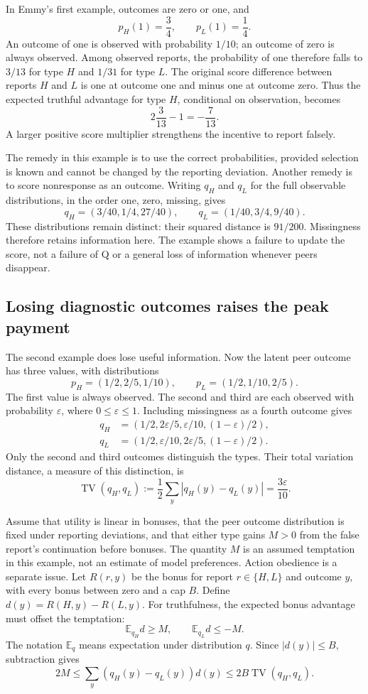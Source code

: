 \documentclass{article}
\begin{document}
In Emmy's first example, outcomes are zero or one, and
\[
p_H(1)=\frac34,\qquad p_L(1)=\frac14.
\]
An outcome of one is observed with probability \(1/10\); an outcome of zero is always observed.
Among observed reports, the probability of one therefore falls to \(3/13\) for type \(H\) and \(1/31\) for type \(L\).
The original score difference between reports \(H\) and \(L\) is one at outcome one and minus one at outcome zero.
Thus the expected truthful advantage for type \(H\), conditional on observation, becomes
\[
2\frac3{13}-1=-\frac7{13}.
\]
A larger positive score multiplier strengthens the incentive to report falsely.

The remedy in this example is to use the correct probabilities, provided selection is known and cannot be
changed by the reporting deviation.
Another remedy is to score nonresponse as an outcome.
Writing \(q_H\) and \(q_L\) for the full observable distributions, in the order one, zero, missing, gives
\[
q_H=(3/40,1/4,27/40),\qquad
q_L=(1/40,3/4,9/40).
\]
These distributions remain distinct: their squared distance is \(91/200\).
Missingness therefore retains information here.
The example shows a failure to update the score, not a failure of Q or a general loss of information whenever peers disappear.

\subsection{Losing diagnostic outcomes raises the peak payment}
The second example does lose useful information.
Now the latent peer outcome has three values, with distributions
\[
p_H=(1/2,2/5,1/10),\qquad
p_L=(1/2,1/10,2/5).
\]
The first value is always observed.
The second and third are each observed with probability \(\varepsilon\), where \(0\leq\varepsilon\leq1\).
Including missingness as a fourth outcome gives
\begin{align*}
q_H&=(1/2,2\varepsilon/5,\varepsilon/10,(1-\varepsilon)/2),\\
q_L&=(1/2,\varepsilon/10,2\varepsilon/5,(1-\varepsilon)/2).
\end{align*}
Only the second and third outcomes distinguish the types.
Their total variation distance, a measure of this distinction, is
\[
\operatorname{TV}(q_H,q_L)
:=\frac12\sum_y|q_H(y)-q_L(y)|=\frac{3\varepsilon}{10}.
\]

Assume that utility is linear in bonuses, that the peer outcome distribution is fixed under reporting
deviations, and that either type gains \(M>0\) from the false report's continuation before bonuses.
The quantity \(M\) is an assumed temptation in this example, not an estimate of model preferences.
Action obedience is a separate issue.
Let \(R(r,y)\) be the bonus for report \(r\in\{H,L\}\) and outcome \(y\), with every bonus between zero and a cap \(B\).
Define \(d(y)=R(H,y)-R(L,y)\).
For truthfulness, the expected bonus advantage must offset the temptation:
\[
\mathbb E_{q_H}d\geq M,\qquad
\mathbb E_{q_L}d\leq-M.
\]
The notation \(\mathbb E_q\) means expectation under distribution \(q\).
Since \(|d(y)|\leq B\), subtraction gives
\[
2M\leq\sum_y(q_H(y)-q_L(y))d(y)
\leq 2B\operatorname{TV}(q_H,q_L).
\]
\end{document}
